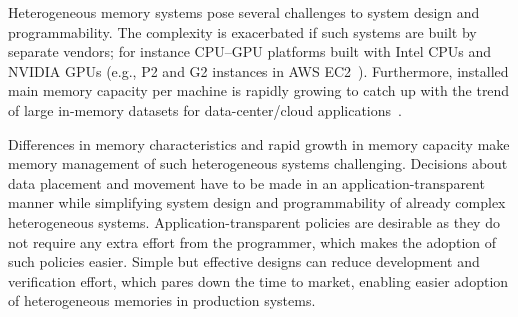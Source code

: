 
Heterogeneous memory systems pose several challenges to
system design and programmability. The complexity is exacerbated if such systems
are built by separate vendors; for instance CPU--GPU platforms built with Intel
CPUs and NVIDIA GPUs (e.g., P2 and G2 instances in AWS EC2~\cite{awsinstances}).
Furthermore, installed main memory capacity per machine is
rapidly growing to catch up with the trend of large in-memory datasets for
data-center/cloud applications~\cite{spark}.


Differences in memory characteristics and rapid growth in memory capacity make
memory management of such heterogeneous systems challenging. Decisions about
data placement and movement have to be made in an application-transparent manner
while simplifying system design and programmability of already complex
heterogeneous systems. Application-transparent policies are desirable as they do
not require any extra effort from the programmer, which makes the adoption of
such policies easier. Simple but effective designs can reduce development and
verification effort, which pares down the time to market, enabling easier adoption of
heterogeneous memories in production systems.

